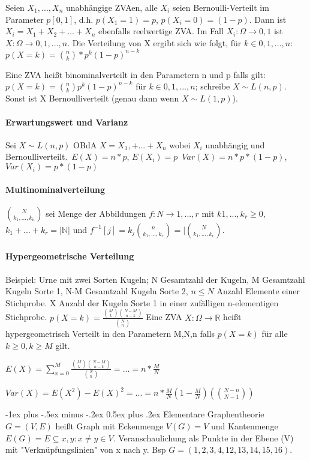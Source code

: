 \documentclass[10pt,landscape]{article}
\makeatletter
\renewcommand{\section}{\@startsection{section}{1}{0mm}%
                                {-1ex plus -.5ex minus -.2ex}%
                                {0.5ex plus .2ex}%
                                {\normalfont\large\bfseries}}
\makeatother
\begin{document}
\begin{multicols}{3}
Seien $X_1,...,X_n$ unabhängige ZVAen, alle $X_i$ seien Bernoulli-Verteilt im Parameter $p[0,1]$, d.h. $p(X_1=1)=p$, $p(X_i=0)=(1-p)$. Dann ist $X_i=X_1+X_2+...+X_n$ ebenfalls reelwertige ZVA. Im Fall $X_i:\Omega\rightarrow {0,1}$ ist $X:\Omega\rightarrow {0,1,...,n}$. Die Verteilung von X ergibt sich wie folgt, für $k\in {0,1,...,n}$: $p(X=k)=\binom{n}{k}*p^k(1-p)^{n-k}$

Eine ZVA heißt binominalverteilt in den Parametern n und p falls gilt: $p(X=k)=\binom{n}{k}p^k (1-p)^{n-k}$ für $k\in{0,1,...,n}$; schreibe $X\sim L(n,p)$. Sonst ist X Bernoulliverteilt (genau dann wenn $X\sim L(1,p)$).

\paragraph{Erwartungswert und Varianz}
Sei $X\sim L(n,p)$ OBdA $X=X_1,+...+X_n$ wobei $X_i$ unabhängig und Bernoulliverteilt.\
$E(X)=n*p$, $E(X_i)=p$\
$Var(X)=n*p*(1-p)$, $Var(X_i)=p*(1-p)$

\paragraph{Multinominalverteilung}
$\binom{N}{k_1,...,k_n}$ sei Menge der Abbildungen $f:N\rightarrow {1,...,r}$ mit $k1,...,k_r\geq 0$, $k_1+...+k_r=|\mathbb{N}|$ und $f^{-1}[{j}]=k_j \binom{n}{k_1,...,k_r} = |\binom{N}{k_1,...,k_r}$.

\paragraph{Hypergeometrische Verteilung}
Beispiel: Urne mit zwei Sorten Kugeln; N Gesamtzahl der Kugeln, M Gesamtzahl Kugeln Sorte 1, N-M Gesamtzahl Kugeln Sorte 2, $n\leq N$ Anzahl Elemente einer Stichprobe. X Anzahl der Kugeln Sorte 1 in einer zufälligen n-elementigen Stichprobe.
$p(X=k)=\frac{\binom{M}{k}\binom{N-M}{n-k}}{\binom{N}{n}}$
Eine ZVA $X:\Omega\rightarrow \mathbb{R}$ heißt hypergeometrisch Verteilt in den Parametern M,N,n falls $p(X=k)$ für alle $k\geq 0, k\geq M$ gilt.

$E(X)=\sum_{x=0}^M \frac{\binom{M}{k}\binom{N-M}{n-k}}{\binom{N}{n}}=...=n*\frac{M}{N}$

$Var(X)=E(X^2)-E(X)^2 =...= n*\frac{M}{N}(1-\frac{M}{N})(\binom{N-n}{N-1})$

\section{Elementare Graphentheorie}
$G=(V,E)$ heißt Graph mit Eckenmenge $V(G)=V$ und Kantenmenge $E(G)=E\subseteq {{x,y}:x\not=y \in V}$. Veranschaulichung als Punkte in der Ebene (V) mit "Verknüpfungslinien" von x nach y. Bsp $G=({1,2,3,4},{12,13,14,15,16})$.


\end{multicols}
\end{document}
